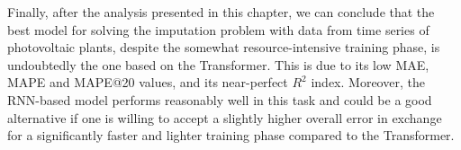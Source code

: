 Finally, after the analysis presented in this chapter, we can conclude that the best model for solving the imputation problem with data from time series of photovoltaic plants, despite the somewhat resource-intensive training phase, is undoubtedly the one based on the Transformer. This is due to its low MAE, MAPE and MAPE@20 values, and its near-perfect $R^2$ index. Moreover, the RNN-based model performs reasonably well in this task and could be a good alternative if one is willing to accept a slightly higher overall error in exchange for a significantly faster and lighter training phase compared to the Transformer.


